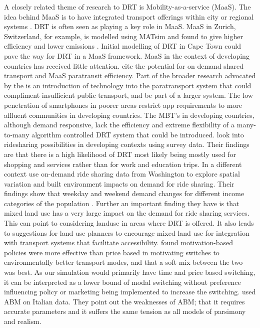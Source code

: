 \documentclass[a4paper]{article}
\begin{document}
A closely related theme of research to DRT is Mobility-as-a-service (MaaS). The idea behind MaaS is to have integrated transport offerings within city or regional systems \citealp{Loubser}. DRT is often seen as playing a key role in MaaS. 
MaaS in Zurich, Switzerland, for example, is modelled using MATsim and found to give higher efficiency and lower emissions \citep{becker2020assessing}.
Initial modelling of DRT in Cape Town could pave the way for DRT in a MaaS framework.
MaaS in the context of developing countries  has received little attention. 
\citealp{Loubser} cite the potential for on demand shared transport and MaaS paratransit efficiency. Part of the broader research advocated by the \citealp{Loubser} is an introduction of technology into the paratransport system that could compliment insufficient public transport, and be part of a larger system. The low penetration of smartphones in poorer areas restrict app requirements to more affluent communities in developing countries. The MBT's in developing countries, although demand responsive, lack the efficiency and extreme flexibility of a many-to-many algorithm controlled DRT system that could be introduced. \citealp{vanderschuren2018ride} look into ridesharing possibilities in developing contexts using survey data. Their findings are that there is a high likelihood of DRT most likely being mostly used for shopping and services rather than for work and education trips. 
In a different context \citealp{yu2019exploring} use on-demand ride sharing data from Washington to explore spatial variation and built environment impacts on demand for ride sharing. Their findings show that weekday and weekend demand changes for different income categories of the population \citep{yu2019exploring}. Further an important finding they have is that mixed land use has a very large impact on the demand for ride sharing services. This can point to considering landuse in areas where DRT is offered. It also leads to suggestions for land use planners to encourage mixed land use for integration with transport systems that facilitate accessibility.
\citealp{maggi2021price} found motivation-based policies were more effective than price based in motivating switches to environmentally better transport modes, and that a soft mix between the two was best. 
As our simulation would primarily have time and price based switching, it can be interpreted as a lower bound of modal switching without preference influencing policy or marketing being implemented to increase the switching.
\citealp{maggi2021price} used ABM on Italian data. They point out the weaknesses of ABM; that it requires accurate parameters and it suffers the same tension as all models of parsimony and realism. \\
\end{document}
